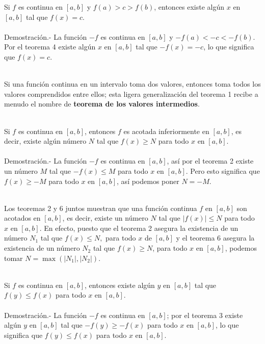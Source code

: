 \begin{teo}
    Si $f$ es continua en $[a,b]$ y $f(a)>c>f(b)$, entonces existe algún $x$ en $[a,b]$ tal que $f(x)=c$.\\\\
    Demostración.-\; La función $-f$ es continua en $[a,b]$ y $-f(a)<-c<-f(b)$. Por el teorema 4 existe algún $x$ en $[a,b]$ tal que $-f(x)=-c$, lo que significa que $f(x)=c$.\\\\
\end{teo}

Si una función continua en un intervalo toma dos valores, entonces toma todos los valores comprendidos entre ellos; esta ligera generalización del teorema 1 recibe a menudo el nombre de \textbf{teorema de los valores intermedios}.\\\\ 

\begin{teo}
    Si $f$ es continua en $[a,b]$, entonces $f$ es acotada inferiormente en $[a,b]$, es decir, existe algún número $N$ tal que $f(x)\geq N$ para todo $x$ en $[a,b]$.\\\\
    Demostración.-\; La función $-f$ es continua en $[a,b]$, así por el teorema 2 existe un número $M$ tal que $-f(x)\leq M$ para todo $x$ en $[a,b]$. Pero esto significa que $f(x)\geq -M$ para todo $x$ en $[a,b]$, así podemos poner $N=-M$.\\\\
\end{teo}

Los teoremas 2 y 6 juntos muestran  que una función continua $f$ en $[a,b]$ son acotados en $[a,b]$, es decir, existe un número $N$ tal que $|f(x)|\leq N$ para todo $x$ en $[a,b]$. En efecto, puesto que el teorema 2 asegura la existencia de un número $N_1$ tal que $f(x)\leq N,$ para todo $x$ de $[a,b]$ y el teorema 6 asegura la existencia de un número $N_2$ tal que $f(x)\geq N$, para todo $x$ en $[a,b]$, podemos tomar $N=\max(|N_1|,|N_2|)$.\\\\

\begin{teo}
    Si $f$ es continua en $[a,b]$, entonces existe algún $y$ en $[a,b]$ tal que $f(y)\leq f(x)$ para todo $x$ en $[a,b]$.\\\\
    Demostración.-\; La función $-f$ es continua en $[a,b]$; por el teorema 3 existe algún $y$ en $[a,b]$ tal que $-f(y)\geq -f(x)$ para todo $x$ en $[a,b]$, lo que significa que $f(y)\leq f(x)$ para todo $x$ en $[a,b]$.\\\\
\end{teo}


